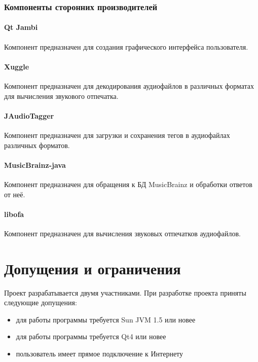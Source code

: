 \documentclass[pdftex,12pt,a4paper]{report}
\providecommand{\comment}[1]{\textcolor{blue}{#1}}
\begin{document}

\subsubsection{Компоненты сторонних производителей}
\paragraph{Qt Jambi}
Компонент предназначен для создания графического интерфейса пользователя.

\paragraph{Xuggle}
Компонент предназначен для декодирования аудиофайлов в различных форматах для вычисления звукового отпечатка.

\paragraph{JAudioTagger}
Компонент предназначен для загрузки и сохранения тегов в аудиофайлах различных форматов.

\paragraph{MusicBrainz-java}
Компонент предназначен для обращения к БД MusicBrainz и обработки ответов от неё.

\paragraph{libofa}
Компонент предназначен для вычисления звуковых отпечатков аудиофайлов.

\section{Допущения и ограничения}
Проект разрабатывается двумя участниками.
При разработке проекта приняты следующие допущения:
\begin{itemize}
	\item для работы программы требуется Sun JVM 1.5 или новее
	\item для работы программы требуется Qt4 или новее
	\item пользователь имеет прямое подключение к Интернету
\end{itemize}
\end{document}
